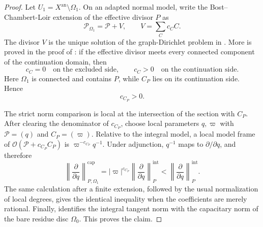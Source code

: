 \documentclass[11pt]{article}
\theoremstyle{definition}
\theoremstyle{remark}
\begin{document}
\begin{proof}
Let $U_1=X^{\mathrm{an}}\setminus\Omega_1$.  On an adapted normal model, write
the Bost--Chambert-Loir extension of the effective divisor $P$ as
\[
 \mathscr P_{\Omega_1}=\mathscr P+V,
 \qquad V=\sum_C c_C C.
\]
The divisor $V$ is the unique solution of the graph-Dirichlet problem in
\cite[Proposition~5.1]{BostChambertLoir2009}.  More is proved in the proof of
\cite[Proposition~5.6]{BostChambertLoir2009}: if the effective divisor meets
every connected component of the continuation domain, then
\[
 c_C=0\quad\text{on the excluded side},
 \qquad c_C>0\quad\text{on the continuation side}.
\]
Here $\Omega_1$ is connected and contains $P$, while $C_P$ lies on its
continuation side.  Hence
\[
 c_{C_P}>0.
\]

The strict norm comparison is local at the intersection of the section with
$C_P$.  After clearing the denominator of $c_{C_P}$, choose local parameters
$q,\varpi$ with $\mathscr P=(q)$ and $C_P=(\varpi)$.  Relative to the integral
model, a local model frame of
$\mathcal O(\mathscr P+c_{C_P}C_P)$ is
$\varpi^{-c_{C_P}}q^{-1}$.  Under adjunction, $q^{-1}$ maps to
$\partial/\partial q$, and therefore
\begin{equation}\label{eq:strict-cap-factor}
 \left\|\frac{\partial}{\partial q}\right\|^{\mathrm{cap}}_{P,\Omega_1}
 =|\varpi|^{c_{C_P}}
  \left\|\frac{\partial}{\partial q}\right\|^{\mathrm{int}}_P
 <\left\|\frac{\partial}{\partial q}\right\|^{\mathrm{int}}_P.
\end{equation}
The same calculation after a finite extension, followed by the usual
normalization of local degrees, gives the identical inequality when the
coefficients are merely rational.  Finally,
\cite[Example~5.11]{BostChambertLoir2009} identifies the integral tangent norm
with the capacitary norm of the bare residue disc $\Omega_0$.  This proves the
claim.
\end{proof}
\end{document}
